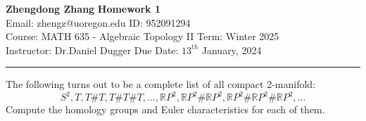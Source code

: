 \documentclass[a4paper, 12pt]{article}
\begin{document}
\noindent
\large\textbf{Zhengdong Zhang} \hfill \textbf{Homework 1}   \\
Email: zhengz@uoregon.edu \hfill ID: 952091294 \\
\normalsize Course: MATH 635 - Algebraic Topology II \hfill Term: Winter 2025\\
Instructor: Dr.Daniel Dugger \hfill Due Date: $13^{th}$ January, 2024 \\
\noindent\rule{7in}{2.8pt}
\begin{problem}{1}
The following turns out to be a complete list of all compact 2-manifold:
\[S^2,T,T\# T,T\#T\#T,\ldots, \mathbb{R}P^2, \mathbb{R}P^2\#\mathbb{R}P^2,\mathbb{R}P^2\#\mathbb{R}P^2\#\mathbb{R}P^2,\ldots\]
Compute the homology groups and Euler characteristics for each of them.
\end{problem}
\end{document}
